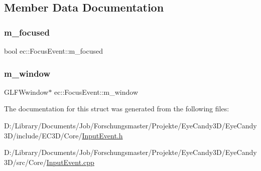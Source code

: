 \subsection{Member Data Documentation}
\mbox{\label{structec_1_1_focus_event_afbca9e2277612590e35c63ef3c445042}} 
\subsubsection{\texorpdfstring{m\+\_\+focused}{m\_focused}}
{\footnotesize\ttfamily bool ec\+::\+Focus\+Event\+::m\+\_\+focused}

\mbox{\label{structec_1_1_focus_event_a44db4d7190f7312e23a56cf90c634187}} 
\subsubsection{\texorpdfstring{m\+\_\+window}{m\_window}}
{\footnotesize\ttfamily G\+L\+F\+Wwindow$\ast$ ec\+::\+Focus\+Event\+::m\+\_\+window}



The documentation for this struct was generated from the following files\+:\begin{DoxyCompactItemize}
\item 
D\+:/\+Library/\+Documents/\+Job/\+Forschungsmaster/\+Projekte/\+Eye\+Candy3\+D/\+Eye\+Candy3\+D/include/\+E\+C3\+D/\+Core/\mbox{\hyperlink{_input_event_8h}{Input\+Event.\+h}}\item 
D\+:/\+Library/\+Documents/\+Job/\+Forschungsmaster/\+Projekte/\+Eye\+Candy3\+D/\+Eye\+Candy3\+D/src/\+Core/\mbox{\hyperlink{_input_event_8cpp}{Input\+Event.\+cpp}}\end{DoxyCompactItemize}
